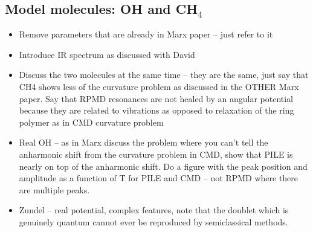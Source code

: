 \documentclass[aps,prb,superscriptaddress,amsmath,amssymb,showpacs,twocolumn]{revtex4}
\begin{document}



\subsection{Model molecules: OH and CH$_4$}

\begin{itemize}
\item Remove parameters that are already in Marx paper -- just refer to it
\item Introduce IR spectrum as discussed with David
\item Discuss the two molecules at the same time -- they are the same, just say
that CH4 shows less of the curvature problem as discussed in the OTHER Marx paper. 
Say that RPMD resonances are not healed by an angular potential because they are related
to vibrations as opposed to relaxation of the ring polymer as in CMD curvature problem
\item Real OH -- as in Marx discuss the problem where you can't tell the anharmonic shift from
the curvature problem in CMD, show that PILE is nearly on top of the anharmonic shift. Do a figure with the peak
position and amplitude as a function of T for PILE and CMD -- not RPMD where there are multiple peaks.
\item Zundel -- real potential, complex features, note that the doublet which is genuinely quantum 
cannot ever be reproduced by semiclassical methods.
\end{itemize}
\end{document}
